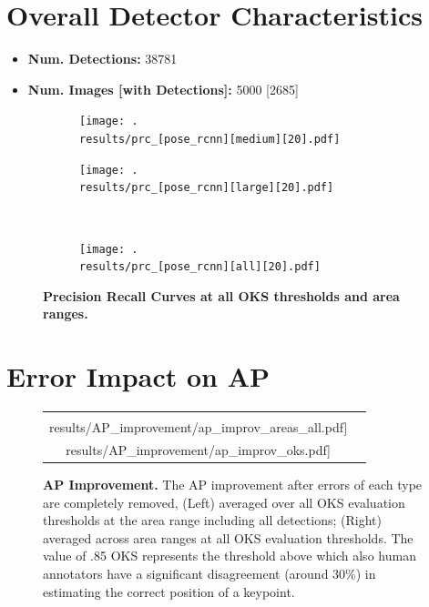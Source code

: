 \documentclass[10pt,onecolumn,letterpaper]{article}
\begin{document}
\section{Overall Detector Characteristics}
\begin{itemize}
    \item \textbf{Num. Detections:} 38781
    \item \textbf{Num. Images [with Detections]:} 5000 [2685]
\end{itemize}
\vspace{-5mm}
\begin{figure}[h!]
\centering
\begin{subfigure}{.4\linewidth}
\centering
\texttt{[image: .\\results/prc\_[pose\_rcnn][medium][20].pdf]}
\label{fig:sub1}
\end{subfigure}%
\begin{subfigure}{.4\linewidth}
\centering
\texttt{[image: .\\results/prc\_[pose\_rcnn][large][20].pdf]}
\label{fig:sub2}
\end{subfigure}\\[1ex]
\begin{subfigure}{\linewidth}
\centering
\texttt{[image: .\\results/prc\_[pose\_rcnn][all][20].pdf]}
\label{fig:sub3}
\end{subfigure}
\vspace{-3mm}
\caption{ {\small \textbf{Precision Recall Curves at all OKS thresholds and area ranges.} }}
\label{fig:test}
\end{figure}

\vspace{-5mm}
\section{Error Impact on AP}
\vspace{-3mm}
\begin{figure}[h!]
\centering
\begin{tabular}{cc}
\texttt{[image: .\\results/AP\_improvement/ap\_improv\_areas\_all.pdf]} &
\texttt{[image: .\\results/AP\_improvement/ap\_improv\_oks.pdf]}\\
\end{tabular}
\caption{ {\small \textbf{AP Improvement.} The AP improvement after errors of each type are completely removed,
(Left) averaged over all OKS evaluation thresholds at the area range including all detections;
(Right) averaged across area ranges at all OKS evaluation thresholds.
The value of .85 OKS represents the threshold above which also human annotators have a significant disagreement (around 30\%) in estimating the correct position of a keypoint.}}
\end{figure}
\end{document}
